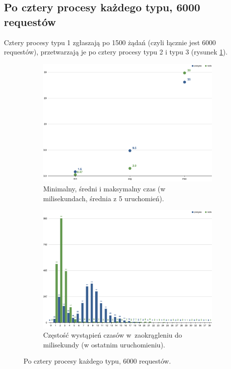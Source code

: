 \documentclass[a4paper,11pt]{article}
\begin{document}
\subsection{Po cztery procesy każdego typu, 6000 requestów}

Cztery procesy typu 1 zgłaszają po 1500 żądań (czyli łącznie jest 6000 requestów), przetwarzają je po cztery procesy typu 2 i typu 3 (rysunek \ref{4-4-4}).
\begin{figure}[h!]
  \centering
  \begin{subfigure}{\textwidth}
    \centering
    \includegraphics[width=\textwidth]{charts/4-4-4-min-avg-max}
    \caption{Minimalny, średni i maksymalny czas (w milisekundach, średnia z 5 uruchomień).}
  \end{subfigure}
  \begin{subfigure}{\textwidth}
    \centering
    \includegraphics[width=\textwidth]{charts/4-4-4-grouped}
    \caption{Częstość wystąpień czasów w~zaokrągleniu do milisekundy (w ostatnim uruchomieniu).}
  \end{subfigure}
  \caption{Po cztery procesy każdego typu, 6000 requestów.}
  \label{4-4-4}
\end{figure}
\end{document}
